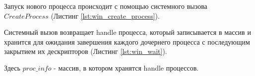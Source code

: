 Запуск нового процесса происходит с помощью системного вызова $CreateProcess$ (Листинг \ref{lst:win_create_process}).


Системный вызов возвращает handle процесса, который записывается в массив и хранится для ожидания завершения каждого дочернего процесса с последующим закрытием их дескрипторов (Листинг \ref{lst:win_wait}).


Здесь $proc\_info$ - массив, в котором хранятся handle процессов.
